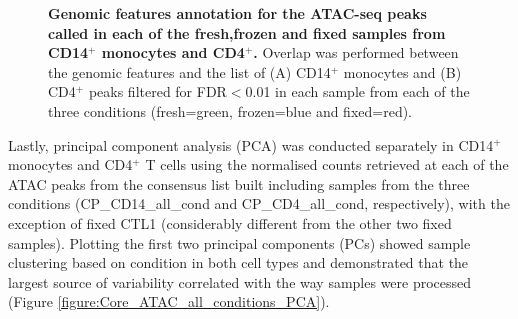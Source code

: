 \begin{figure}[htbp]
\begin{subfigure}{0.5\textwidth}
\caption{\textbf{}}
\end{subfigure}
\caption[Genomic features annotation for the ATAC-seq peaks called in each of the fresh,frozen and fixed samples from CD14$^+$ monocytes and total CD4$^+$.]{\textbf{Genomic features annotation for the ATAC-seq peaks called in each of the fresh,frozen and fixed samples from CD14$^+$ monocytes and CD4$^+$.} Overlap was performed between the genomic features and the list of (A) CD14$^+$ monocytes and (B) CD4$^+$ peaks filtered for FDR$<$0.01 in each sample from each of the three conditions (fresh=green, frozen=blue and fixed=red).}
\label{figure:Core_ATAC_all_conditions_genomic_features}
\end{figure} 


Lastly, principal component analysis (PCA) was conducted separately in CD14$^+$ monocytes and CD4$^+$ T cells using the normalised counts retrieved at each of the ATAC peaks from the consensus list built including samples from the three conditions (CP\_CD14\_all\_cond and CP\_CD4\_all\_cond, respectively), with the exception of fixed CTL1 (considerably different from the other two fixed samples). Plotting the first two principal components (PCs) showed sample clustering based on condition in both cell types and demonstrated that the largest source of variability correlated with the way samples were processed (Figure \ref{figure:Core_ATAC_all_conditions_PCA}). 



